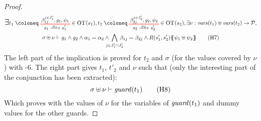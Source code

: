 \documentclass{article}
\begin{document}
\begin{proof}
\begin{multline}
		\bigsymb{\exists} t_1 \defobject \OTx{1}{}{1}{1} \in \fOT{s_1}, t_2 \defobject \OTx{2}{}{2}{2} \in \fOT{s_2}, \exists \nu: \fvars{t_1} \uplus \fvars{t_2} \to \values, \\
		\sigma \uplus \nu \vdash g_1 \wedge g_2 \wedge \alpha_1 = \alpha_2 \wedge \bigwedge_\subbox{j \in J'_1 \cap J'_2} \beta_{1j} = \beta_{2j} \wedge R\mpar{s'_1, s'_2}\psubst{\psi_1 \uplus \psi_2} \hyp{7}
	\end{multline}
	The left part of the implication is proved for \(t_2\) and \(\sigma\) (for the values covered by \(\nu\)) with \hyp{6}.
	The right part gives \(t_1\), \(t'_2\) and \(\nu\) such that (only the interesting part of the conjunction has been extracted):
	\[ \sigma \uplus \nu \vdash \fguard{t_1} \hyp{8} \]
	Which proves  with the values of \(\nu\) for the variables of \(\mathit{guard}{\left(t_1\right)}\) and dummy values for the other guards.
\end{proof}
\end{document}
